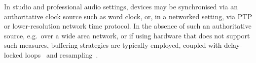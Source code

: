 In studio and professional audio settings, devices may be synchronised via an
authoritative clock source such as word clock, or, in a networked setting,
via PTP or lower-resolution network time protocol.
In the absence of such an authoritative source, e.g.\ over a wide area network,
or if using hardware that does not support such measures, buffering strategies
are typically employed, coupled with delay-locked
loops~\citep{adriaensen_using_2005} and
resampling~\citep{adriaensen_controlling_2012}.
